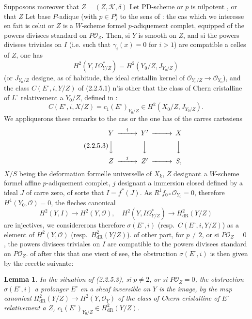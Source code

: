 \documentclass[12pt,a4paper]{article}
\theoremstyle{plain}
\newtheorem{lemma}[theorem]{Lemma}
\theoremstyle{definition}
\theoremstyle{remark}
\begin{document}
Supposons moreover that $Z = (Z, \mathcal{K}, \delta)$ Let PD-scheme or $p$ is nilpotent \cite{Berthelot}, or that $Z$ Let base $P$-adique (with $p \in P$) to the sens of \cite[7.17]{BerthelotOgus}: the cas which we interesse en fait is celui or $Z$ is a $W$-scheme formel $p$-adiquement complet, equipped of the powers divisees standard on $P\mathcal{O}_Z$. Then, si $Y$ is smooth on $Z$, and si the powers divisees triviales on $I$ (i.e. such that $\gamma_i(x) = 0$ for $i > 1$) are compatible a celles of $Z$, one has
\[
H^2(Y, I\Omega^*_{Y/Z}) = H^2(Y_0/Z, J_{Y_0/Z})
\]
(or $J_{Y_0/Z}$ designe, as of habitude, the ideal cristallin kernel of $\mathcal{O}_{Y_0/Z} \to \mathcal{O}_{Y_0}$), and the class $C(E^\circ, i, Y/Z)$ of (2.2.5.1) n'is other that the class of Chern cristalline of $L^\circ$ relativement a $Y_0/Z$, defined in \cite{BerthelotIllusie}:
\begin{equation}\tag{2.2.5.2}
C(E^\circ, i, X/Z) = c_1(E^\circ)_{Y_0/Z} \in H^2(X_0/Z, J_{Y_0/Z}). 
\end{equation}
We appliquerons these remarks to the cas or the one has of the carres cartesiens
\begin{equation}\tag{2.2.5.3}
\begin{CD}
Y @>{i}>> Y' @>>> X \\
@VVV @VVV @VVV \\
Z @>{j}>> Z' @>>> S,
\end{CD} 
\end{equation}
$X/S$ being the deformation formelle universelle of $X_k$, $Z$ designant a $W$-scheme formel affine $p$-adiquement complet, $j$ designant a immersion closed defined by a ideal $J$ of carre zero, of sorte that $I = f^*(J)$. As $R^1f_{0*}\mathcal{O}_{Y_0} = 0$, therefore $H^1(Y_0, \mathcal{O}) = 0$, the fleches canonical
\[
H^2(Y, I) \longrightarrow H^2(Y, \mathcal{O}), \quad H^2(Y, I\Omega^*_{Y/Z}) \longrightarrow H^2_\mathrm{dR}(Y/Z)
\]
are injectives, we considererons therefore $\sigma(E^\circ, i)$ (resp.\ $C(E^\circ, i, Y/Z)$) as a element of $H^2(Y, \mathcal{O})$ (resp.\ $H^2_\mathrm{dR}(Y/Z)$). of other part, for $p \neq 2$, or si $P\mathcal{O}_Z = 0$, the powers divisees triviales on $I$ are compatible to the powers divisees standard on $P\mathcal{O}_Z$. of after this that one vient of see, the obstruction $\sigma(E^\circ, i)$ is then given by the recette suivante:

\begin{lemma}\label{lem:2.2.6}
In the situation of (2.2.5.3), si $p \neq 2$, or si $P\mathcal{O}_Z = 0$, the obstruction $\sigma(E^\circ, i)$ a prolonger $E^\circ$ en a sheaf inversible on $Y$ is the image, by the map canonical $H^2_\mathrm{dR}(Y/Z) \to H^2(Y, \mathcal{O}_Y)$ of the class of Chern cristalline of $E^\circ$ relativement a $Z$, $c_1(E^\circ)_{Y_0/Z} \in H^2_\mathrm{dR}(Y/Z)$.
\end{lemma}
\end{document}
